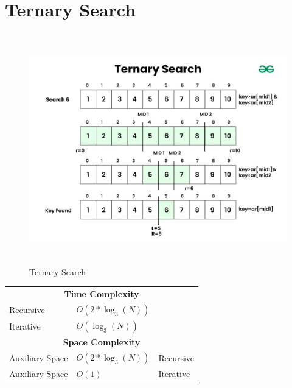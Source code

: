 \section{Ternary Search \cite{gfg-ternary-search}}\label{Ternary Search}
\begin{table}[h]
    \begin{minipage}{0.5\linewidth}
        \begin{figure}[H]
            \centering
            \includegraphics[width=\linewidth, height=10cm, keepaspectratio]{Pictures/ds-algo/Ternary-Search.jpg}
            \caption{Ternary Search}
        \end{figure}
    \end{minipage}
    \hfill
    \begin{minipage}{0.47\linewidth}
        \begin{table}[H]
            \begin{tabular}{l l l}
                \multicolumn{3}{c}{\textbf{Time Complexity}} \\
                 Recursive & $O(2*\log_3(N))$ & \\
                 Iterative & $O(\log_3(N))$ & \\
                 \multicolumn{3}{c}{\textbf{Space Complexity}}\\
                 Auxiliary Space & $O(2*\log_3(N))$ & Recursive \\
                 Auxiliary Space & $O(1)$ & Iterative \\
            \end{tabular}
        \end{table}
    \end{minipage}
\end{table}

